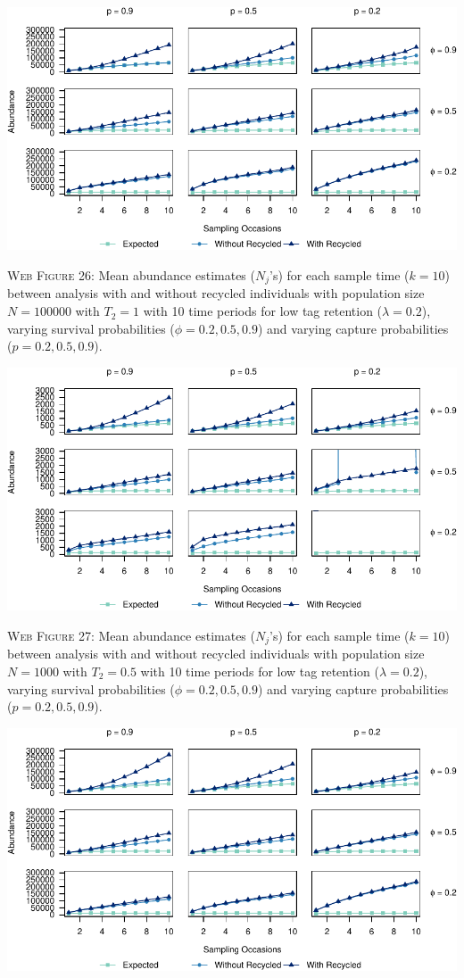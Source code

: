 \documentclass[]{article}
\begin{document}
\includegraphics{Appendix_files/figure-latex/26_abundance_L_GJSTL2-1.pdf}

\textsc{Web Figure 26:} Mean abundance estimates (\(N_j\)'s) for each
sample time (\(k=10\)) between analysis with and without recycled
individuals with population size \(N=100000\) with \(T_2=1\) with 10
time periods for low tag retention (\(\lambda=0.2\)), varying survival
probabilities (\(\phi=0.2,0.5,0.9\)) and varying capture probabilities
(\(p=0.2,0.5,0.9\)).

\newpage

\includegraphics{Appendix_files/figure-latex/27_abundance_L_GJSTL4-1.pdf}

\textsc{Web Figure 27:} Mean abundance estimates (\(N_j\)'s) for each
sample time (\(k=10\)) between analysis with and without recycled
individuals with population size \(N=1000\) with \(T_2=0.5\) with 10
time periods for low tag retention (\(\lambda=0.2\)), varying survival
probabilities (\(\phi=0.2,0.5,0.9\)) and varying capture probabilities
(\(p=0.2,0.5,0.9\)).

\includegraphics{Appendix_files/figure-latex/28_abundance_L_GJSTL3-1.pdf}
\end{document}

